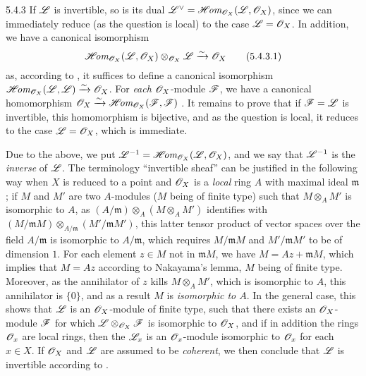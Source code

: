 \begin{env}{5.4.3}
\label{env-0.5.4.3}
If $\mathscr{L}$ is invertible, so is its dual ${\mathscr{L}}^\vee=\mathscr{H}\!\textit{om}_{\mathscr{O}_X}(\mathscr{L},\mathscr{O}_X)$, since
we can immediately reduce (as the question is local) to the case $\mathscr{L}=\mathscr{O}_X$. In addition,
we have a canonical isomorphism
\[
  \mathscr{H}\!\textit{om}_{\mathscr{O}_X}(\mathscr{L},\mathscr{O}_X)\otimes_{\mathscr{O}_X}\mathscr{L}\xrightarrow{\sim}\mathscr{O}_X
  \tag{5.4.3.1}
\]
as, according to , it suffices to define a canonical isomorphism
$\mathscr{H}\!\textit{om}_{\mathscr{O}_X}(\mathscr{L},\mathscr{L})\xrightarrow{\sim}\mathscr{O}_X$. For \emph{each} $\mathscr{O}_X$-module $\mathscr{F}$, we have
a canonical homomorphism $\mathscr{O}_X\xrightarrow{\sim}\mathscr{H}\!\textit{om}_{\mathscr{O}_X}(\mathscr{F},\mathscr{F})$ . It
remains to prove that if $\mathscr{F}=\mathscr{L}$ is invertible, this homomorphism is bijective, and
as the question is local, it reduces to the case $\mathscr{L}=\mathscr{O}_X$, which is immediate.

Due to the above, we put $\mathscr{L}^{-1}=\mathscr{H}\!\textit{om}_{\mathscr{O}_X}(\mathscr{L},\mathscr{O}_X)$, and we say that
$\mathscr{L}^{-1}$ is the \emph{inverse} of $\mathscr{L}$. The terminology ``invertible sheaf'' can be
justified in the following way when $X$ is reduced to a point and $\mathscr{O}_X$ is a \emph{local}
ring $A$ with maximal ideal $\mathfrak{m}$; if $M$ and $M'$ are two $A$-modules ($M$ being of
finite type) such that $M\otimes_A M'$ is isomorphic to $A$, as
$(A/\mathfrak{m})\otimes_A(M\otimes_A M')$ identifies with
$(M/\mathfrak{m}M)\otimes_{A/\mathfrak{m}}(M'/\mathfrak{m}M')$, this latter tensor product
of vector spaces over the field $A/\mathfrak{m}$ is isomorphic to $A/\mathfrak{m}$, which
requires $M/\mathfrak{m}M$ and $M'/\mathfrak{m}M'$ to be of dimension $1$. For each element
$z\in M$ not in $\mathfrak{m}M$, we have $M=Az+\mathfrak{m}M$, which implies that $M=Az$
according to Nakayama's lemma, $M$ being of finite type. Moreover, as the annihilator of $z$
kills $M\otimes_A M'$, which is isomorphic to $A$, this annihilator is $\{0\}$, and as a
result $M$ is \emph{isomorphic to $A$}. In the general case, this shows that $\mathscr{L}$ is an
$\mathscr{O}_X$-module of finite type, such that there exists an $\mathscr{O}_X$-module $\mathscr{F}$ for which
$\mathscr{L}\otimes_{\mathscr{O}_X}\mathscr{F}$ is isomorphic to $\mathscr{O}_X$, and if in addition the rings $\mathscr{O}_x$
are local rings, then the $\mathscr{L}_x$ is an $\mathscr{O}_x$-module isomorphic to $\mathscr{O}_x$ for each
$x\in X$. If $\mathscr{O}_X$ and $\mathscr{L}$ are assumed to be \emph{coherent}, we then conclude that
$\mathscr{L}$ is invertible according to .
\end{env}

